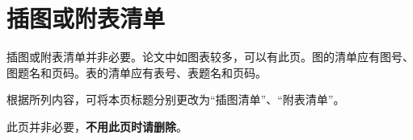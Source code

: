 {\centering\chapter*{插图或附表清单}}  %

插图或附表清单并非必要。论文中如图表较多，可以有此页。图的清单应有图号、图题名和页码。表的清单应有表号、表题名和页码。

根据所列内容，可将本页标题分别更改为“插图清单”、“附表清单”。

此页并非必要，\textbf{不用此页时请删除}。